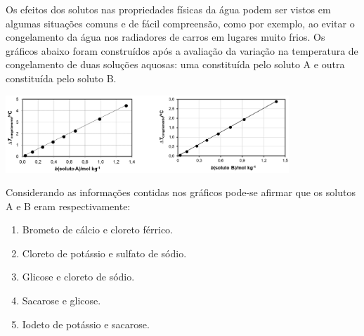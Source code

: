 Os efeitos dos solutos nas propriedades físicas da água podem ser vistos em algumas situações comuns e de fácil compreensão, como por exemplo, ao evitar o congelamento da água nos radiadores de carros em lugares muito frios. Os gráficos abaixo foram construídos após a avaliação da variação na temperatura de congelamento de duas soluções aquosas: uma constituída pelo soluto A e outra constituída pelo soluto B.

\begin{center}
\includegraphics[width=0.8\textwidth]{figure.png}
\end{center}

Considerando as informações contidas nos gráficos pode-se afirmar que os solutos A e B eram respectivamente: 

\begin{enumerate}[label = (\alph*)]
	\item Brometo de cálcio e cloreto férrico.
	\item Cloreto de potássio e sulfato de sódio.
	\item Glicose e cloreto de sódio.
	\item Sacarose e glicose.
	\item Iodeto de potássio e sacarose.
\end{enumerate}
